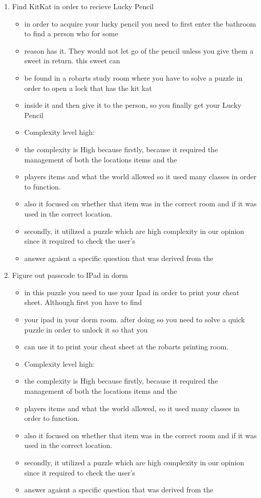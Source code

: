 \documentclass[11pt]{article}
\begin{document}
\begin{enumerate}
\item Find KitKat in order to recieve Lucky Pencil
	\begin{itemize}
	\item in order to acquire your lucky pencil you need to first enter the bathroom to find a person who for some
	\item reason has it. They would not let go of the pencil unless you give them a sweet in return. this sweet can
	\item be found in a robarts study room where you have to solve a puzzle in order to open a lock that has the kit kat
	\item inside it and then give it to the person, so you finally get your Lucky Pencil
	\item Complexity level high:
	\item the complexity is High because firstly, because it required the management of both the locations items and the
	\item players items and what the world allowed so it used many classes in order to function.
	\item also it focused on whether that item was in the correct room and if it was used in the correct location.
	\item secondly, it utilized a puzzle which are high complexity in our opinion since it required to check the user's
	\item answer agaisnt a specific question that was derived from the
	\end{itemize}

\item Figure out passcode to IPad in dorm
	\begin{itemize}
	\item in this puzzle you need to use your Ipad in order to print your cheat sheet. Although first you have to find
	\item your ipad in your dorm room. after doing so you need to solve a quick puzzle in order to unlock it so that you
	\item can use it to print your cheat sheet at the robarts printing room.
	\item Complexity level high:
	\item the complexity is High because firstly, because it required the management of both the locations items and the
	\item players items and what the world allowed, so it used many classes in order to function.
	\item also it focused on whether that item was in the correct room and if it was used in the correct location.
	\item secondly, it utilized a puzzle which are high complexity in our opinion since it required to check the user's
	\item answer agaisnt a specific question that was derived from the
	\end{itemize}



\end{enumerate}
\end{document}
